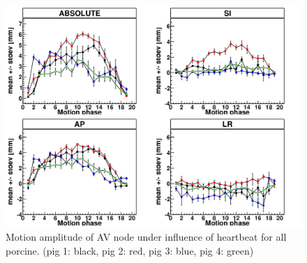 \documentclass[type=dr, dr=rernat, accentcolor=tud7b,colorbacktitle, bigchapter, openright, twoside, 12pt ]{tudthesis}
\begin{document}
\begin{figure}[H]
\begin{center}
 \includegraphics[scale=0.3]{Mayo_AV_HB.png}
\caption{Motion amplitude of AV node under influence of heartbeat for all porcine. (pig 1: black, pig 2: red, pig 3: blue, 
pig 4: green) }
\end{center}
\label{motion_hb_all_av}
\end{figure}



\end{document}
